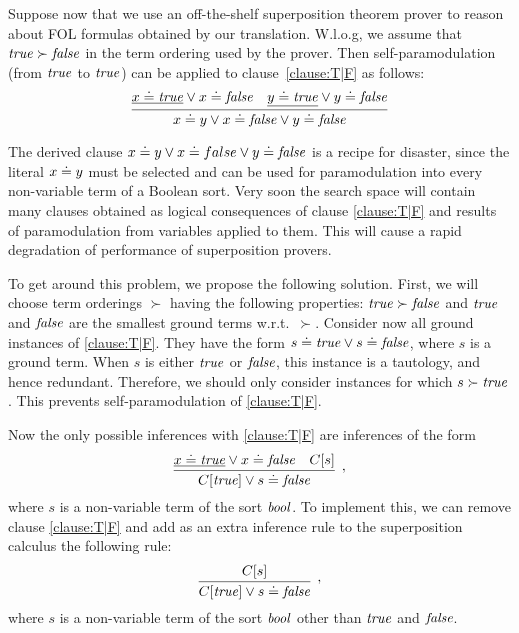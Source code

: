Suppose now that we use an off-the-shelf superposition theorem prover to reason about FOL formulas obtained by our translation. W.l.o.g, we assume that $\mathit{true} \succ \mathit{false}$ in the term ordering used by the prover. Then self-paramodulation (from $\mathit{true}$ to $\mathit{true}$) can be applied to clause~\eqref{clause:T|F} as follows:
\[
\infer{x \eql y \vee x \eql \false \vee y \eql \false}%
{\underline{x \eql \true} \vee x \eql \false & \underline{y \eql \true} \vee y \eql \false}
\]

The derived clause $x \doteq y \vee x \doteq false \vee y \doteq \mathit{false}$ is a recipe for disaster, since the literal $x \doteq y$ must be selected and can be used for paramodulation into every non-variable term of a Boolean sort. Very soon the search space will contain many clauses obtained as logical consequences of clause \eqref{clause:T|F} and results of paramodulation from variables applied to them. This will cause a rapid degradation of performance of superposition provers.

To get around this problem, we propose the following solution. First, we will choose term
orderings $\succ$ having the following properties: $\mathit{true}\succ\mathit{false}$ and $\mathit{true}$ and
$\mathit{false}$ are the smallest ground terms w.r.t.\ $\succ$. Consider now all ground instances of \eqref{clause:T|F}. They have the form $s \doteq \mathit{true} \vee s \doteq \mathit{false}$, where $s$ is a ground term. When $s$ is either $\mathit{true}$ or $\mathit{false}$, this instance is a tautology, and hence redundant. Therefore, we should only consider instances for which $s \succ \mathit{true}$. This prevents self-paramodulation of \eqref{clause:T|F}.

Now the only possible inferences with \eqref{clause:T|F} are inferences of the form
\[
\infer[,]{C[\true] \vee s \eql \false}%
{\underline{x \eql \true} \vee x \eql \false & C[s]}
\]
where $s$ is a non-variable term of the sort $\mathit{bool}$.
To implement this, we can remove clause \eqref{clause:T|F} and add as an extra inference rule to the superposition calculus the following rule:
\[
\infer[,]{C[\true] \vee s \eql \false}%
{C[s]}
\]
where $s$ is a non-variable term of the sort $\mathit{bool}$ other than $\mathit{true}$ and $\mathit{false}$.
